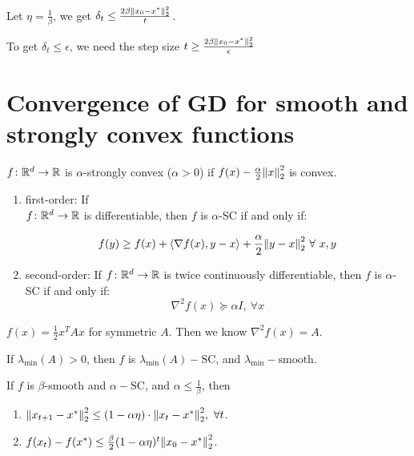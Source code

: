 \begin{remark}
    Let \(\eta = \frac{1}{\beta}\), we get \(\delta_t \leq \frac{2 \beta \norm{x_0 - x^*}_2^2}{t}\). 

    To get \(\delta_t \leq \epsilon\), we need the step size \(t \geq \frac{2 \beta \norm{x_0 - x^*}_2^2}{\epsilon}\)
\end{remark}


\section{Convergence of GD for smooth and strongly convex functions}

\begin{definition}
    \(f \colon \mathbb{R}^d \to \mathbb{R}\) is \(\alpha\)-strongly convex (\(\alpha > 0\)) if 
    \(f(x) - \frac{\alpha}{2} \norm{x}_2^2\) is convex. 
\end{definition}

\begin{lemma}
    \begin{enumerate}
        \item first-order: If \\ \(f \colon \mathbb{R}^d \to \mathbb{R}\) is differentiable, then 
        \(f\) is \(\alpha\)-SC if and only if: 
        
        \[
            f(y) \geq f(x) + \langle \nabla f(x),  y - x \rangle + \frac{\alpha}{2} \norm{y-x}_2^2 
            \ \forall \ x, y  
        \]
        \item second-order: If \(f \colon \mathbb{R}^d \to \mathbb{R}\) is twice continuously differentiable, 
        then \(f\) is \(\alpha\)-SC if and only if: 
        \[
            \nabla^2 f(x) \succeq \alpha I, \ \forall x   
        \] 
    \end{enumerate} 
\end{lemma}

\begin{eg}
    \(f(x) = \frac{1}{2}x^T A x\) for symmetric \(A\). Then we know \(\nabla^2 f(x) = A\). 

    If \(\lambda_{\text{min}}(A) > 0\), then \(f\) is \(\lambda_{\text{min}}(A)-\text{SC}\), 
    and \(\lambda_{\text{min}}-\text{smooth}\). 
\end{eg}

\begin{theorem}
    If \(f\) is \(\beta\)-smooth and \(\alpha-\text{SC}\), and \(\alpha \leq \frac{1}{\beta}\), 
    then 
    \begin{enumerate}
        \item \(\norm{x_{t+1} - x^*}_2^2 \leq (1 - \alpha \eta) \cdot \norm{x_t - x^*}_2^2, \ \forall t\). 
        \item \(f(x_t) - f(x^*) \leq \frac{\beta}{2} (1 - \alpha \eta)^t \norm{x_0 - x^*}_2^2\). 
    \end{enumerate}
\end{theorem}


